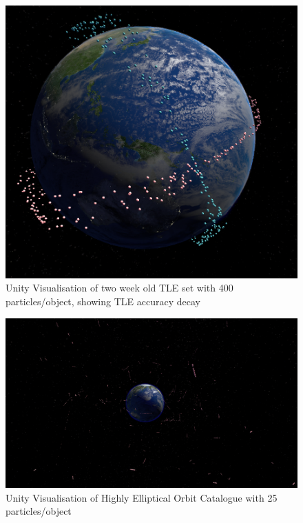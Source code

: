 \documentclass[12pt,openany,a4paper]{book}
\begin{document}
				\begin{figure}[H]
					\centering
					\caption{Unity Visualisation of two week old TLE set with 400 particles/object, showing TLE accuracy decay}
					\label{unityOutD}
					\includegraphics[scale=0.4]{unityOutD.png}
				\end{figure}
				

				
				\begin{figure}[H]
					\centering
					\caption{Unity Visualisation of Highly Elliptical Orbit Catalogue with 25 particles/object}
					\label{unityHEO}
					\includegraphics[scale=0.45]{uHEO.png}
				\end{figure}
				
\end{document}
